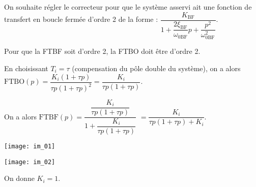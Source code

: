 \vspace{.25cm}

On souhaite régler le correcteur pour que le système asservi ait une fonction de transfert en boucle fermée
d’ordre 2 de la forme :
$\dfrac{K_{\text{BF}}}{1+\dfrac{2\xi_{\text{BF}}}{\omega_{0\text{BF}}}p+\dfrac{p^2}{\omega_{0\text{BF}}^2}}$.


\ifprof
\begin{corrige}
Pour que la FTBF soit d'ordre 2, la FTBO doit être d'ordre 2. 

En choisissant $T_i = \tau$ (compensation du pôle double du système), on a alors 
$\text{FTBO}(p)=\dfrac{K_i (1+\tau p)}{\tau p (1+\tau p)^2}=\dfrac{K_i }{\tau p (1+\tau p)}$.

On a alors 
$\text{FTBF}(p) = \dfrac{\dfrac{K_i }{\tau p (1+\tau p)}}{1+\dfrac{K_i }{\tau p (1+\tau p)}}$
$= \dfrac{K_i}{\tau p (1+\tau p)+K_i }$.

\end{corrige}
\else
\fi



\begin{marginfigure}
\texttt{[image: im\_01]}
\end{marginfigure}

\begin{marginfigure}
\texttt{[image: im\_02]}
\end{marginfigure}


%
%
%

%

On donne $K_i=1$. 



